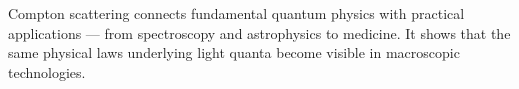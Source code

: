 \begin{PhysicsBox}[Summary]
	Compton scattering connects fundamental quantum physics with practical
	applications — from spectroscopy and astrophysics to medicine.
	It shows that the same physical laws underlying light quanta
	become visible in macroscopic technologies.
\end{PhysicsBox}
